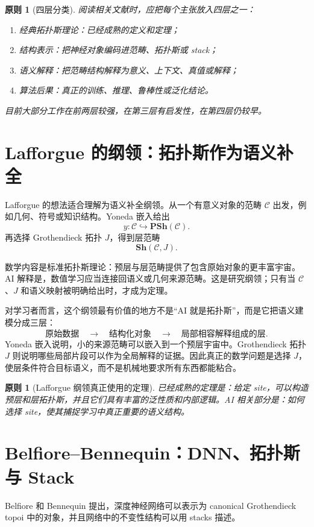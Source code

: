 \documentclass[UTF8,11pt,fontset=none]{ctexart}
\newtheorem{principle}[definition]{原则}
\newcommand{\PSh}{\mathbf{PSh}}
\newcommand{\Sh}{\mathbf{Sh}}
\begin{document}
\begin{principle}[四层分类]
阅读相关文献时，应把每个主张放入四层之一：
\begin{enumerate}
\item 经典拓扑斯理论：已经成熟的定义和定理；
\item 结构表示：把神经对象编码进范畴、拓扑斯或 stack；
\item 语义解释：把范畴结构解释为意义、上下文、真值或解释；
\item 算法后果：真正的训练、推理、鲁棒性或泛化结论。
\end{enumerate}
目前大部分工作在前两层较强，在第三层有启发性，在第四层仍较早。
\end{principle}

\section{Lafforgue 的纲领：拓扑斯作为语义补全}

Lafforgue 的想法适合理解为语义补全纲领。从一个有意义对象的范畴 \(\mathcal C\) 出发，例如几何、符号或知识结构。Yoneda 嵌入给出
\[
y:\mathcal C\hookrightarrow \PSh(\mathcal C).
\]
再选择 Grothendieck 拓扑 \(J\)，得到层范畴
\[
\Sh(\mathcal C,J).
\]

数学内容是标准拓扑斯理论：预层与层范畴提供了包含原始对象的更丰富宇宙。AI 解释是，数值学习应当连接回语义或几何来源范畴。这是研究纲领；只有当 \(\mathcal C\)、\(J\) 和语义映射被明确给出时，才成为定理。

对学习者而言，这个纲领最有价值的地方不是“AI 就是拓扑斯”，而是它把语义建模分成三层：
\[
\text{原始数据}\quad\longrightarrow\quad
\text{结构化对象}\quad\longrightarrow\quad
\text{局部相容解释组成的层}.
\]
Yoneda 嵌入说明，小的来源范畴可以嵌入到一个预层宇宙中。Grothendieck 拓扑 \(J\) 则说明哪些局部片段可以作为全局解释的证据。因此真正的数学问题是选择 \(J\)，使层条件符合目标语义，而不是机械地要求所有东西都能粘合。

\begin{principle}[Lafforgue 纲领真正使用的定理]
已经成熟的定理是：给定 site，可以构造预层和层拓扑斯，并且它们具有丰富的泛性质和内部逻辑。AI 相关部分是：如何选择 site，使其捕捉学习中真正重要的语义结构。
\end{principle}

\section{Belfiore--Bennequin：DNN、拓扑斯与 Stack}

Belfiore 和 Bennequin 提出，深度神经网络可以表示为 canonical Grothendieck topoi 中的对象，并且网络中的不变性结构可以用 stacks 描述。
\end{document}
